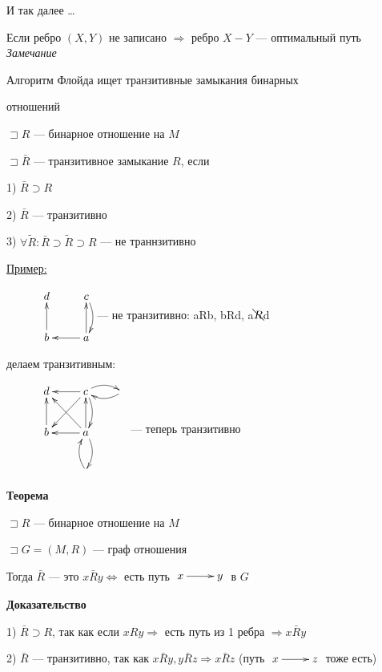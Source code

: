 \documentclass[a4paper, 12pt] {article}
\begin{document}
И так далее \dots

Если ребро $ (X, Y) $ не записано $ \Rightarrow $ ребро $ X - Y $ --- оптимальный путь\\

\newpage
\textit{Замечание}

Алгоритм Флойда ищет транзитивные замыкания бинарных 

отношений

$ \sqsupset R $ --- бинарное отношение на $ M $

$ \sqsupset \bar R $ --- транзитивное замыкание $ R $, если 

1) $ \bar R \supset R $

2) $ \bar R $ --- транзитивно

3) $ \forall \tilde R: \bar R \supset \tilde R \supset R $ --- не траннзитивно

\underline{Пример:}

$ \begin{matrix}
	\xymatrix{
		& d \ar@{<-}[d] & c  \ar@/^/[d] \\
		& b  & a \ar@{->}[l] \ar@{->}[u] \\
	}
\end{matrix}$ --- не транзитивно: aRb, bRd, a$ \bcancel R$d

делаем транзитивным:

$ \begin{matrix}
	\xymatrix{
		& d \ar@{<-}[d] & c  \ar@/^/[d] \ar@{->}[dl] \ar@{->}[l] \ar@/^/[r] &  \ar@/^/[l] \\
		& b  & a \ar@/^/[d] \ar@{->}[lu] \ar@{->}[l] \ar@{->}[u] \\
		& &  \ar@/^/[u]
	}
\end{matrix}$ --- теперь транзитивно

\textbf{Теорема}

$ \sqsupset R $ --- бинарное отношение на $ M $

$ \sqsupset G=(M, R) $ --- граф отношения

Тогда $ \bar R $ --- это $ x\bar Ry \Leftrightarrow $ есть путь
$ \begin{matrix}
	\xymatrix{
		x \ar@{->}[r] & y  \\
	}
\end{matrix}$ в $ G $

\textbf{Доказательство}

1) $ \bar R \supset R $, так как если $ xRy \Rightarrow$ есть путь из 1 ребра $ \Rightarrow x\bar Ry $

2) $ \bar R $ --- транзитивно, так как $ x\bar Ry, y\bar Rz \Rightarrow x\bar Rz$ (путь $ \begin{matrix}
	\xymatrix{
		x \ar@{->}[r] & z  \\
	}
\end{matrix}$ тоже есть)
\end{document}
